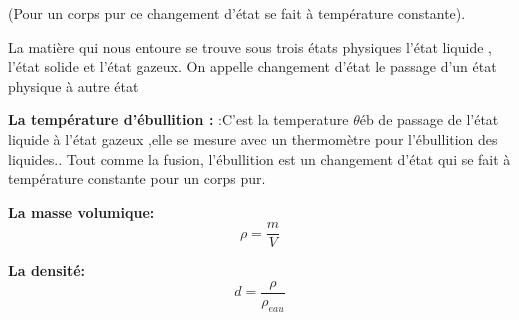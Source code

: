 \documentclass[12pt]{article}
\begin{document}
(Pour un corps pur ce changement d'état se fait à température constante).

La matière qui nous entoure se trouve sous trois états physiques l'état liquide , l'état solide et l'état gazeux. On
appelle changement d'état le passage d'un état physique à autre état

\textbf{La température d'ébullition :}
:C'est la temperature $\theta$éb de passage de l'état liquide à l'état gazeux ,elle se mesure avec un thermomètre pour l'ébullition des liquides.. Tout comme la fusion, l'ébullition est un changement d'état qui se fait à température constante pour un corps pur.

\textbf{La masse volumique:} $$\rho = \frac{m}{V}$$

\textbf{La densité: }$$d = \frac{\rho}{\rho_{eau}}$$
\end{document}

